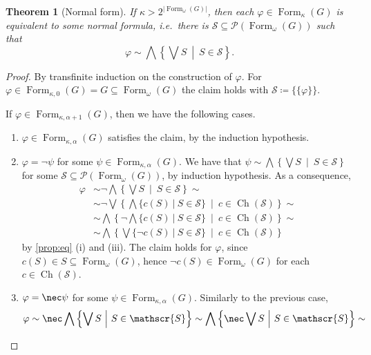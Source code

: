 \documentclass{article}
\newtheorem{thm}{Theorem}
\theoremstyle{definition}
\DeclareMathOperator{\Ch}{Ch}
\DeclareMathOperator{\Formulas}{Form}
\begin{document}
\begin{thm}[Normal form]\label{thm:normal}
If $\kappa > 2^{|\Formulas_\omega(G)|}$, then each $\varphi \in \Formulas_\kappa(G)$ is equivalent to some normal formula, i.e.\ there is $\mathscr{S} \subseteq \mathcal{P}(\Formulas_\omega(G))$ such that
$$\varphi \sim \bigwedge \left\{\bigvee S\ \middle\vert\ S \in \mathscr{S} \right\}.$$
\end{thm}
\begin{proof}
By transfinite induction on the construction of $\varphi$. For $\varphi \in \Formulas_{\kappa,0}(G) = G \subseteq \Formulas_\omega(G)$ the claim holds with $\mathscr{S} \coloneqq \{\{\varphi\}\}$.

If $\varphi \in \Formulas_{\kappa,\alpha+1}(G)$, then we have the following cases.
\begin{enumerate}
    \item $\varphi \in \Formulas_{\kappa,\alpha}(G)$ satisfies the claim, by the induction hypothesis.
    \item $\varphi = \neg \psi$ for some $\psi \in \Formulas_{\kappa,\alpha}(G)$. We have that $\psi \sim \bigwedge \left\{\bigvee S\ \middle\vert\ S \in \mathscr{S} \right\}$ for some $\mathscr{S} \subseteq \mathcal{P}(\Formulas_\omega(G))$, by induction hypothesis. As a consequence,
    \begin{align*}
        \varphi &\sim \neg \bigwedge \left\{\bigvee S\ \middle\vert\ S \in \mathscr{S} \right\} \sim \\
        &\sim \neg \bigvee \left\{\bigwedge \{c(S)\ \vert\ S \in \mathscr{S}\}\ \middle\vert\ c \in \Ch(\mathscr{S})\right\} \sim \\
        &\sim \bigwedge \left\{\neg \bigwedge \{c(S)\ \vert\ S \in \mathscr{S}\}\ \middle\vert\ c \in \Ch(\mathscr{S})\right\} \sim \\
        &\sim \bigwedge \left\{\bigvee \{\neg c(S)\ \vert\ S \in \mathscr{S}\}\ \middle\vert\ c \in \Ch(\mathscr{S})\right\}
    \end{align*}
    by \cref{prop:eq} (i) and (iii). The claim holds for $\varphi$, since $c(S) \in S \subseteq \Formulas_\omega(G)$, hence $\neg c(S) \in \Formulas_\omega(G)$ for each $c \in \Ch(\mathscr{S})$.
    \item $\varphi = \nec \psi$ for some $\psi \in \Formulas_{\kappa,\alpha}(G)$. Similarly to the previous case,
    \begin{align*}
        \varphi &\sim \nec \bigwedge \left\{\bigvee S\ \middle\vert\ S \in \mathscr{S} \right\} \sim \bigwedge \left\{\nec \bigvee S\ \middle\vert\ S \in \mathscr{S} \right\} \sim \\

\end{align*}
\end{enumerate}
\end{proof}
\end{document}
